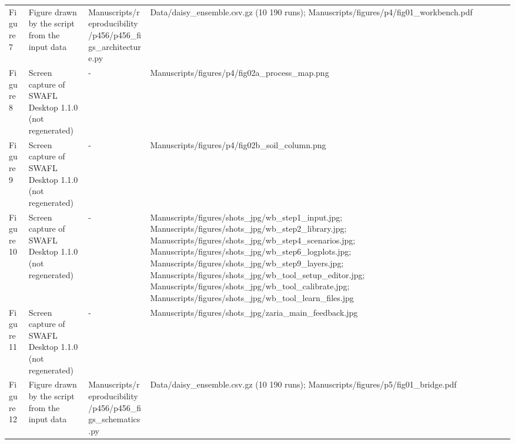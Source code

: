 {\begin{longtable}{p{}p{}p{}p{}}
{}Figure 7 & Figure drawn by the script from the input data & Manuscripts/\allowbreak{}reproducibility/\allowbreak{}p456/\allowbreak{}p456\_\allowbreak{}figs\_\allowbreak{}architecture.py & Data/\allowbreak{}daisy\_\allowbreak{}ensemble.csv.gz (10 190 runs);  Manuscripts/\allowbreak{}figures/\allowbreak{}p4/\allowbreak{}fig01\_\allowbreak{}workbench.pdf\\
{}Figure 8 & Screen capture of SWAFL Desktop 1.1.0 (not regenerated) & - & Manuscripts/\allowbreak{}figures/\allowbreak{}p4/\allowbreak{}fig02a\_\allowbreak{}process\_\allowbreak{}map.png\\
{}Figure 9 & Screen capture of SWAFL Desktop 1.1.0 (not regenerated) & - & Manuscripts/\allowbreak{}figures/\allowbreak{}p4/\allowbreak{}fig02b\_\allowbreak{}soil\_\allowbreak{}column.png\\
{}Figure 10 & Screen capture of SWAFL Desktop 1.1.0 (not regenerated) & - & Manuscripts/\allowbreak{}figures/\allowbreak{}shots\_\allowbreak{}jpg/\allowbreak{}wb\_\allowbreak{}step1\_\allowbreak{}input.jpg;  Manuscripts/\allowbreak{}figures/\allowbreak{}shots\_\allowbreak{}jpg/\allowbreak{}wb\_\allowbreak{}step2\_\allowbreak{}library.jpg;  Manuscripts/\allowbreak{}figures/\allowbreak{}shots\_\allowbreak{}jpg/\allowbreak{}wb\_\allowbreak{}step4\_\allowbreak{}scenarios.jpg;  Manuscripts/\allowbreak{}figures/\allowbreak{}shots\_\allowbreak{}jpg/\allowbreak{}wb\_\allowbreak{}step6\_\allowbreak{}logplots.jpg;  Manuscripts/\allowbreak{}figures/\allowbreak{}shots\_\allowbreak{}jpg/\allowbreak{}wb\_\allowbreak{}step9\_\allowbreak{}layers.jpg;  Manuscripts/\allowbreak{}figures/\allowbreak{}shots\_\allowbreak{}jpg/\allowbreak{}wb\_\allowbreak{}tool\_\allowbreak{}setup\_\allowbreak{}editor.jpg;  Manuscripts/\allowbreak{}figures/\allowbreak{}shots\_\allowbreak{}jpg/\allowbreak{}wb\_\allowbreak{}tool\_\allowbreak{}calibrate.jpg;  Manuscripts/\allowbreak{}figures/\allowbreak{}shots\_\allowbreak{}jpg/\allowbreak{}wb\_\allowbreak{}tool\_\allowbreak{}learn\_\allowbreak{}files.jpg\\
{}Figure 11 & Screen capture of SWAFL Desktop 1.1.0 (not regenerated) & - & Manuscripts/\allowbreak{}figures/\allowbreak{}shots\_\allowbreak{}jpg/\allowbreak{}zaria\_\allowbreak{}main\_\allowbreak{}feedback.jpg\\
{}Figure 12 & Figure drawn by the script from the input data & Manuscripts/\allowbreak{}reproducibility/\allowbreak{}p456/\allowbreak{}p456\_\allowbreak{}figs\_\allowbreak{}schematics.py & Data/\allowbreak{}daisy\_\allowbreak{}ensemble.csv.gz (10 190 runs);  Manuscripts/\allowbreak{}figures/\allowbreak{}p5/\allowbreak{}fig01\_\allowbreak{}bridge.pdf\\

\end{longtable}}
